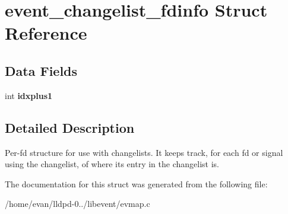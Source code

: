 \section{event\-\_\-changelist\-\_\-fdinfo \-Struct \-Reference}
\label{structevent__changelist__fdinfo}
\subsection*{\-Data \-Fields}
\begin{DoxyCompactItemize}
\item 
int {\bfseries idxplus1}\label{structevent__changelist__fdinfo_ad15c2c6f7db3126f6459cb6e757c6dfb}

\end{DoxyCompactItemize}


\subsection{\-Detailed \-Description}
\-Per-\/fd structure for use with changelists. \-It keeps track, for each fd or signal using the changelist, of where its entry in the changelist is. 

\-The documentation for this struct was generated from the following file\-:\begin{DoxyCompactItemize}
\item 
/home/evan/lldpd-\/0../libevent/evmap.\-c\end{DoxyCompactItemize}
